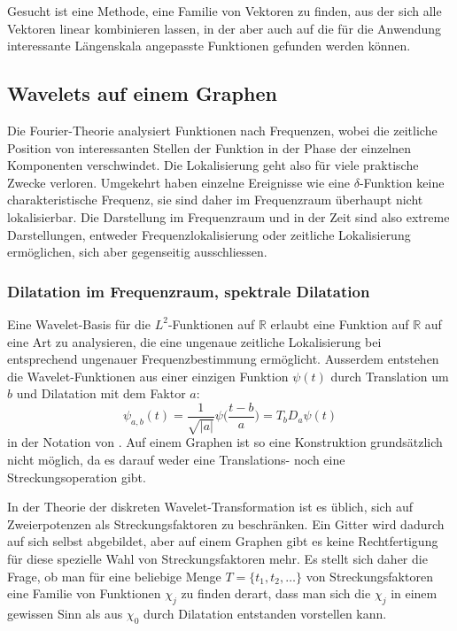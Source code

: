 Gesucht ist eine Methode, eine Familie von Vektoren zu finden,
aus der sich alle Vektoren linear kombinieren lassen, in der aber
auch auf die für die Anwendung interessante Längenskala angepasste
Funktionen gefunden werden können.

\subsection{Wavelets auf einem Graphen}
Die Fourier-Theorie analysiert Funktionen nach Frequenzen, wobei die 
zeitliche Position von interessanten Stellen der Funktion in der Phase
der einzelnen Komponenten verschwindet.
Die Lokalisierung geht also für viele praktische Zwecke verloren.
Umgekehrt haben einzelne Ereignisse wie eine $\delta$-Funktion keine
charakteristische Frequenz, sie sind daher im Frequenzraum überhaupt 
nicht lokalisierbar.
Die Darstellung im Frequenzraum und in der Zeit sind also extreme
Darstellungen, entweder Frequenzlokalisierung oder zeitliche Lokalisierung
ermöglichen, sich aber gegenseitig ausschliessen.

\subsubsection{Dilatation im Frequenzraum, spektrale Dilatation}
Eine Wavelet-Basis für die $L^2$-Funktionen auf $\mathbb{R}$ erlaubt
eine Funktion auf $\mathbb{R}$ auf eine Art zu analysieren, die eine
ungenaue zeitliche Lokalisierung bei entsprechend ungenauer
Frequenzbestimmung ermöglicht.
Ausserdem entstehen die Wavelet-Funktionen aus einer einzigen Funktion
$\psi(t)$ durch Translation um $b$ und Dilatation mit dem Faktor $a$:
\[
\psi_{a,b}(t)
=
\frac{1}{\sqrt{|a|}} \psi\biggl(\frac{t-b}a\biggr)
=
T_bD_a\psi(t)
\]
in der Notation von \cite{buch:mathsem-wavelets}.
Auf einem Graphen ist so eine Konstruktion grundsätzlich nicht möglich,
da es darauf weder eine Translations- noch eine Streckungsoperation gibt.

In der Theorie der diskreten Wavelet-Transformation ist es üblich, sich
auf Zweierpotenzen als Streckungsfaktoren zu beschränken.
Ein Gitter wird dadurch auf sich selbst abgebildet, aber auf einem
Graphen gibt es keine Rechtfertigung für diese spezielle Wahl von
Streckungsfaktoren mehr.
Es stellt sich daher die Frage, ob man für eine beliebige Menge
\(
T= \{ t_1,t_2,\dots\}
\)
von Streckungsfaktoren eine Familie von Funktionen $\chi_j$ zu finden
derart, dass man sich die $\chi_j$ in einem gewissen Sinn als aus
$\chi_0$ durch Dilatation entstanden vorstellen kann.

